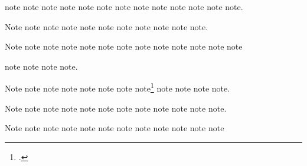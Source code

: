 \documentclass[a4paper,12pt]{report}
\begin{document}
note\autocite{harley:ancient:cart} note
note\autocite{hua:cms} note\autocite{jackson:paulina:letter}
note\autocite{harleymt:hoc}
note\autocite[43]{harleymt:hoc-harleymt:ancient:cart}
note\autocite[54]{harleymt:hoc-harleymt:cartography}
note\autocite{hlatky:hrt} note\autocite{james:ambassadors}
note\autocite{holiday:fool} note\autocite{horowitz:youtube}
note\autocite{horsley:prosodies} note\autocite{quora:thread}.

Note\autocite{hua:cms} \autocite{keating:dearborn}
note\autocite{jackson:paulina:letter} note\autocite{kern}
note\autocite{kessler:nyt} note\autocite{james:ambassadors}
note\autocite{kimluu:diethyl} note\autocite{keating:dearborn}
note\autocite{kozinn:review} note\autocite{kern}
note\autocite{lach:asia} note\autocite{kessler:nyt}.

Note\autocite{kimluu:diethyl} note\autocite{lakeforester:pushcarts}
note\autocite{kozinn:review} note\autocite{levistrauss:savage}
note\autocite{lach:asia} note\autocite{leo:madonna}
note\autocite{lewis} note\autocite{lakeforester:pushcarts}
note\autocite{levistrauss:savage} note\autocite{lecarre:quest}
note\autocite[29]{lewis} note\autocite{lecarre:quest}
note\autocite{licis:diazcomment}

note\autocite{lippincott:chicago} note\autocite{loften:hamlet}
note\autocite{maisonneuve:relations} note\autocite{licis:diazcomment}.

Note\autocite{lippincott:chicago} note\autocite{loften:hamlet}
note\autocite{mayberry:brady} note\autocite{mccurry:afghangirl}
note\autocite{mchugh:wake} note\autocite{mcmillen:antebellum}
note\autocite{maisonneuve:relations}
note\footnote{.}
note\autocite{mayberry:brady} note\autocite{mccurry:afghangirl}
note\autocite{mchugh:wake} note\autocite[6.9.4]{mla:style}.

Note\autocite{morgenson:market} note\autocite{mozart:figaro}
note\autocite{murphy:silent} note\autocite{nasa:db}
note\autocite{nass:address} note\autocite{mcmillen:antebellum}
note\autocite{niso:bibref} note\autocite{natrecoff:camera}
note\autocite[2:25]{meredith:letters} note\autocite[6.9.5]{mla:style}
note\autocite{morgenson:market} note\autocite{murphy:silent}.

Note\autocite{mozart:figaro} note\autocite{nasa:db}
note\autocite{nass:address} note\autocite{niso:bibref}
note\autocite{nyt:obittrevor} note\autocite{nyt:trevorobit}
note\autocite{nytrumpet:art} note\autocite{obrien:recycle}
note\autocite{osborne:poison} note\autocite{oed:cdrom}
note\autocite{natrecoff:camera} note\autocite{palmatary:pottery}
\end{document}
